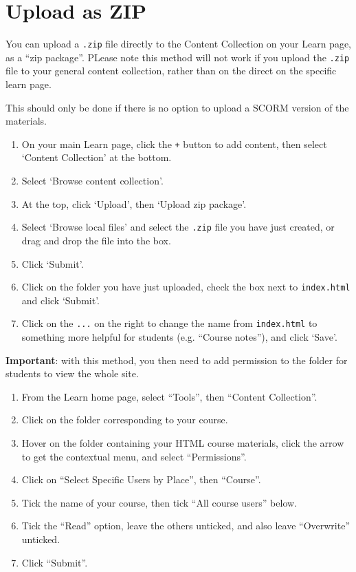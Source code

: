 \section{Upload as ZIP}
\label{appb:zip}

You can upload a \verb|.zip| file directly to the Content Collection on your Learn page, as a ``zip package''. PLease note this method will not work if you upload the \verb|.zip| file to your general content collection, rather than on the direct on the specific learn page.

This should only be done if there is no option to upload a SCORM version of the materials.

\begin{enumerate}
    \item On your main Learn page, click the \verb|+| button to add content, then select `Content Collection' at the bottom.
    \item Select `Browse content collection'.
    \item At the top, click `Upload', then `Upload zip package'.
    \item Select `Browse local files' and select the \verb|.zip| file you have just created, or drag and drop the file into the box.
    \item Click `Submit'.
    \item Click on the folder you have just uploaded, check the box next to \verb|index.html| and click `Submit'. 
    \item Click on the \verb|...| on the right to change the name from \verb|index.html| to something more helpful for students (e.g. ``Course notes''), and click `Save'.
\end{enumerate}

\textbf{Important}: with this method, you then need to add permission to the folder for students to view the whole site.

\begin{enumerate}
    \item From the Learn home page, select ``Tools'', then ``Content Collection''.
    \item Click on the folder corresponding to your course.
    \item Hover on the folder containing your HTML course materials, click the arrow to get the contextual menu, and select ``Permissions''.
    \item Click on ``Select Specific Users by Place'', then ``Course''.
    \item Tick the name of your course, then tick ``All course users'' below.
    \item Tick the ``Read'' option, leave the others unticked, and also leave ``Overwrite'' unticked.
    \item Click ``Submit''.
\end{enumerate}
